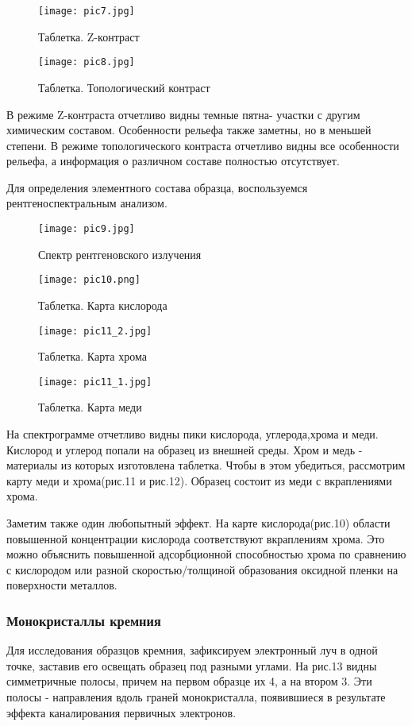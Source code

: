 \documentclass[a4paper,12pt]{article}
\theoremstyle{plain} %
\theoremstyle{definition} %
\theoremstyle{remark} %
\begin{document}
\begin{figure}[H]
	\centering
	\texttt{[image: pic7.jpg]}
	\caption{Таблетка. Z-контраст}
	\label{pic7}
\end{figure}
\begin{figure}[H]
	\centering
	\texttt{[image: pic8.jpg]}
	\caption{Таблетка. Топологический контраст}
	\label{pic8}
\end{figure}

В режиме Z-контраста   отчетливо видны темные пятна- участки с другим химическим составом. Особенности рельефа также заметны, но в меньшей степени. В режиме топологического контраста  отчетливо видны все особенности рельефа, а информация о различном составе полностью отсутствует.

Для определения элементного состава образца, воспользуемся рентгеноспектральным анализом. 

\begin{figure}[H]
	\centering
	\texttt{[image: pic9.jpg]}
	\caption{Спектр рентгеновского излучения}
	\label{pic9}
\end{figure} 
\begin{figure}[H]
	\centering
	\texttt{[image: pic10.png]}
	\caption{Таблетка. Карта кислорода}
	\label{pic10}
\end{figure}
\begin{figure}[H]
	\centering
	\texttt{[image: pic11\_2.jpg]}
	\caption{Таблетка. Карта хрома}
	\label{pic11_2}
\end{figure}
\begin{figure}[H]
	\centering
	\texttt{[image: pic11\_1.jpg]}
	\caption{Таблетка. Карта меди}
	\label{pic11_1}
\end{figure}

На спектрограмме отчетливо видны пики кислорода, углерода,хрома и меди. Кислород и углерод попали на образец из внешней среды. Хром и медь - материалы из которых изготовлена таблетка. Чтобы в этом убедиться, рассмотрим карту меди и хрома(рис.11 и рис.12). Образец состоит из меди с вкраплениями хрома. 

Заметим также один любопытный эффект. На карте кислорода(рис.10) области повышенной концентрации кислорода соответствуют вкраплениям хрома. Это можно объяснить повышенной адсорбционной способностью хрома по сравнению с кислородом или разной скоростью/толщиной образования оксидной пленки на поверхности металлов. 

\subsubsection{Монокристаллы кремния}
Для исследования образцов кремния, зафиксируем электронный луч в одной точке, заставив его освещать образец под разными углами. На рис.13 видны симметричные полосы, причем на первом образце их 4, а на втором 3. Эти полосы - направления вдоль граней монокристалла, появившиеся в результате эффекта каналирования первичных электронов.
\end{document}
